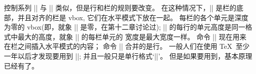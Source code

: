 {{{%
\danger 控制系列 |\valign| 与 |\halign| 类似，但是行和栏的规则要改变。%
在这种情况下，|\cr| 是栏的底部，并且对齐的栏是 vbox, 它们在水平模式下放在一起。%
每栏的各个单元是深度为零的 vbox(即，就象 |\boxmaxdepth| 是零，在第十二章讨论过);
|\valign| 的每行的单元高度是同一格式中最大的高度，就象 |\halign| 的每栏单元的%
宽度是最大宽度一样。%
命令 |\noalign| 现在用来在栏之间插入水平模式的内容；
命令 |\span| 合并的是行。%
一般人们在使用 \TeX\ 至少一年以后才发现要用到 |\valign|;
并且一般只是单行格式`||'。%
但是如果要用到，基本原理已经有了。

\endchapter

}}}
